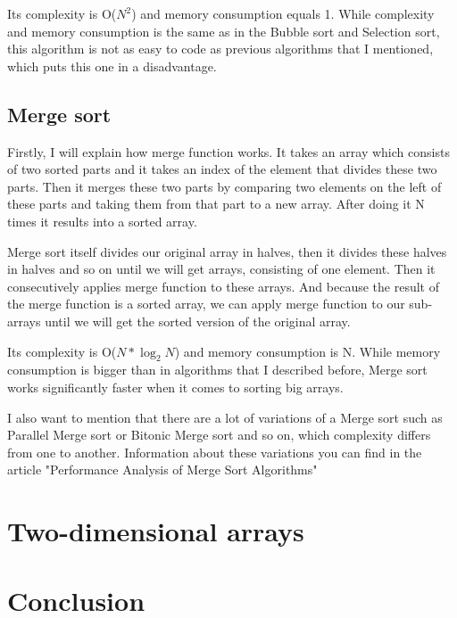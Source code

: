 \documentclass[12pt,twoside,a4paper]{article}
\begin{document}
Its complexity is O($N^{2}$) and memory consumption equals 1. While complexity and memory consumption is the same as in the Bubble sort and Selection sort, this algorithm is not as easy to code as previous algorithms that I mentioned, which puts this one in a disadvantage.

\subsection{Merge sort}
Firstly, I will explain how merge function works. It takes an array which consists of two sorted parts and it takes an index of the element that divides these two parts. Then it merges these two parts by comparing two elements on the left of these parts and taking them from that part to a new array. After doing it N times it results into a sorted array.

Merge sort itself divides our original array in halves, then it divides these halves in halves and so on until we will get arrays, consisting of one element. Then it consecutively applies merge function to these arrays. And because the result of the merge function is a sorted array, we can apply merge function to our sub-arrays until we will get the sorted version of the original array.

Its complexity is O($N*\log_2N$) and memory consumption is N. While memory consumption is bigger than in algorithms that I described before, Merge sort works significantly faster when it comes to sorting big arrays. 

I also want to mention that there are a lot of variations of a Merge sort such as Parallel Merge sort or Bitonic Merge sort and so on, which complexity differs from one to another. Information about these variations you can find in the article "Performance Analysis of Merge Sort Algorithms"\cite{merge}

\section{Two-dimensional arrays} \label{2_dim_arr}


\section{Conclusion} \label{conclusion} 





\end{document}
